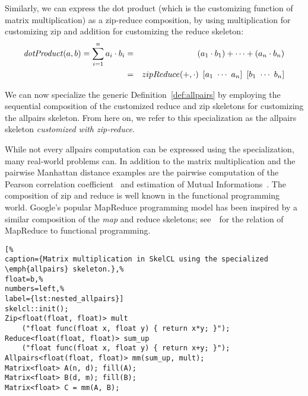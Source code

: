 Similarly, we can express the dot product (which is the customizing function of matrix multiplication) as a zip-reduce composition, by using multiplication for customizing zip and addition for customizing the reduce skeleton:
\begin{eqnarray*}
  \dotProduct(a, b) = \sum_{i = 1}^{n} a_i \cdot b_i &=& (a_1 \cdot b_1) + \cdots + (a_n \cdot b_n) \\
  &=& zipReduce(+, \cdot)\ \DottedVector{a_1}{a_n}\ \DottedVector{b_1}{b_n}
\end{eqnarray*}

We can now specialize the generic Definition~\ref{def:allpairs} by employing the sequential composition of the customized reduce and zip skeletons for customizing the allpairs skeleton.
From here on, we refer to this specialization as the allpairs skeleton \emph{customized with zip-reduce}.

While not every allpairs computation can be expressed using the specialization, many real-world problems can.
In addition to the matrix multiplication and the pairwise Manhattan distance examples are the pairwise computation of the Pearson correlation coefficient~\cite{DaDQR-09} and estimation of Mutual Informations~\cite{DaSSK-04}.
The composition of zip and reduce is well known in the functional programming world.
Google's popular MapReduce programming model has been inspired by a similar composition of the \emph{map} and reduce skeletons; see~\cite{La-07}~for the relation of MapReduce to functional programming.

\begin{lstlisting}[%                                                             
caption={Matrix multiplication in SkelCL using the specialized \emph{allpairs} skeleton.},%
float=b,%                                                                       
numbers=left,%
label={lst:nested_allpairs}]
skelcl::init();
Zip<float(float, float)> mult
    ("float func(float x, float y) { return x*y; }");
Reduce<float(float, float)> sum_up
    ("float func(float x, float y) { return x+y; }");
Allpairs<float(float, float)> mm(sum_up, mult);
Matrix<float> A(n, d); fill(A);
Matrix<float> B(d, m); fill(B);
Matrix<float> C = mm(A, B);
\end{lstlisting}


